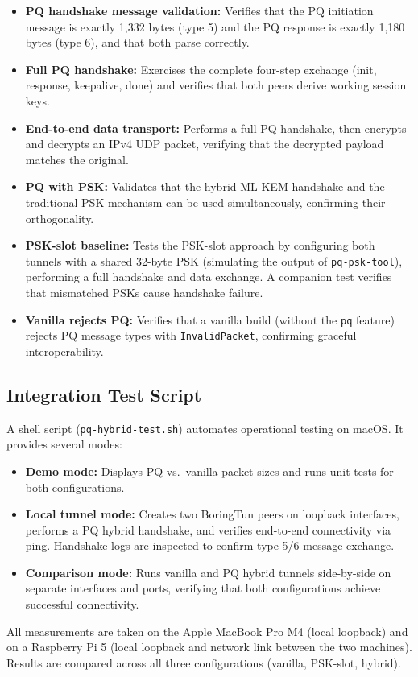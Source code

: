 \begin{itemize}
\item \textbf{PQ handshake message validation:} Verifies that the PQ initiation message is exactly 1,332 bytes (type 5) and the PQ response is exactly 1,180 bytes (type 6), and that both parse correctly.

\item \textbf{Full PQ handshake:} Exercises the complete four-step exchange (init, response, keepalive, done) and verifies that both peers derive working session keys.

\item \textbf{End-to-end data transport:} Performs a full PQ handshake, then encrypts and decrypts an IPv4 UDP packet, verifying that the decrypted payload matches the original.

\item \textbf{PQ with PSK:} Validates that the hybrid ML-KEM handshake and the traditional PSK mechanism can be used simultaneously, confirming their orthogonality.

\item \textbf{PSK-slot baseline:} Tests the PSK-slot approach by configuring both tunnels with a shared 32-byte PSK (simulating the output of \texttt{pq-psk-tool}), performing a full handshake and data exchange. A companion test verifies that mismatched PSKs cause handshake failure.

\item \textbf{Vanilla rejects PQ:} Verifies that a vanilla build (without the \texttt{pq} feature) rejects PQ message types with \texttt{InvalidPacket}, confirming graceful interoperability.
\end{itemize}

\subsection{Integration Test Script}

A shell script (\texttt{pq-hybrid-test.sh}) automates operational testing on macOS. It provides several modes:

\begin{itemize}
\item \textbf{Demo mode:} Displays PQ vs.\ vanilla packet sizes and runs unit tests for both configurations.

\item \textbf{Local tunnel mode:} Creates two BoringTun peers on loopback interfaces, performs a PQ hybrid handshake, and verifies end-to-end connectivity via ping. Handshake logs are inspected to confirm type 5/6 message exchange.

\item \textbf{Comparison mode:} Runs vanilla and PQ hybrid tunnels side-by-side on separate interfaces and ports, verifying that both configurations achieve successful connectivity.
\end{itemize}

All measurements are taken on the Apple MacBook Pro M4 (local loopback) and on a Raspberry Pi 5 (local loopback and network link between the two machines). Results are compared across all three configurations (vanilla, PSK-slot, hybrid).

